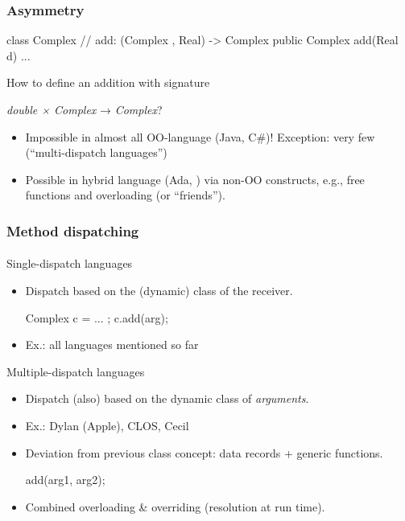 \documentclass{beamer}
\begin{document}
\begin{frame}[fragile]
\frametitle{Asymmetry}
\begin{cplus3}
class Complex 
{
    // add: (Complex , Real) -> Complex  
    public Complex add(Real d) {...}
}
\end{cplus3}
How to define an addition with signature 
\begin{center}
\textit{double × Complex} → \textit{Complex}?
\end{center}
\begin{itemize}
\item Impossible in almost all OO-language (Java, C\#)!
Exception: very few (``multi-dispatch languages'') 
\item Possible in hybrid language (Ada, \Cpp) via non-OO constructs,
e.g., free functions and overloading (or ``friends''). 
\end{itemize}
\end{frame}

\begin{frame}[fragile]
\frametitle{Method dispatching}
\framesubtitle{}

Single-dispatch languages
\begin{itemize}
\item Dispatch based on the (dynamic) class of the receiver. 
\begin{cplus3}
     Complex c = ... ;   
     c.add(arg);
\end{cplus3}
\item Ex.: all languages mentioned so far

\end{itemize}

Multiple-dispatch languages
\begin{itemize}
\item Dispatch (also) based on the dynamic class of \textit{arguments}.
\item Ex.: Dylan (Apple), CLOS, Cecil
\item Deviation from previous class concept: data records + generic functions.
\begin{cplus3}
     add(arg1, arg2);
\end{cplus3}
\item Combined overloading \& overriding (resolution at run time).
\end{itemize} 
\end{frame}
\end{document}
